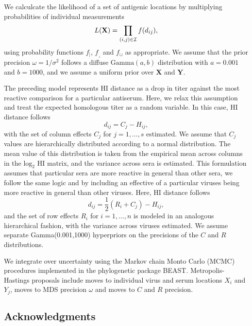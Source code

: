 \documentclass[11pt,oneside,letterpaper]{article}
\newcommand{\point}{f_{\scriptscriptstyle \vert}}
\newcommand{\threshold}{f_{\textstyle \lrcorner}}
\newcommand{\interval}{f_{\sqcup}}
\begin{document}
We calculcate the likelihood of a set of antigenic locations by multiplying probabilities of individual measurements
\begin{equation} 
	L(\mathbf{X}) = \prod_{(i,j) \in \cal I} f(d_{ij}),
\end{equation}
using probability functions $\point$, $\threshold$ and $\interval$ as appropriate.
We assume that the prior precision $\omega = 1/\sigma^2$ follows a diffuse $\mbox{Gamma}(a, b)$ distribution with $a=0.001$ and $b=1000$, and we assume a uniform prior over $\mathbf{X}$ and $\mathbf{Y}$.

The preceding model represents HI distance as a drop in titer against the most reactive comparison for a particular antiserum.  
Here, we relax this assumption and treat the expected homologous titer as a random variable.
In this case, HI distance follows
\begin{equation} 
	d_{ij} =  C_j - H_{ij},
\end{equation}
with the set of column effects $C_j$ for $j = 1,\ldots, s$ estimated.
We assume that $C_j$ values are hierarchically distributed according to a normal distribution.
The mean value of this distribution is taken from the empirical mean across columns in the $\mathrm{log}_2$ HI matrix, and the variance across sera is estimated.
This formulation assumes that particular sera are more reactive in general than other sera, we follow the same logic and by including an effective of a particular viruses being more reactive in general than other viruses.
Here, HI distance follows
\begin{equation} 
	d_{ij} =  \frac{1}{2} (R_i+C_j) - H_{ij},
\end{equation}
and the set of row effects $R_i$ for $i = 1,\ldots, n$ is modeled in an analogous hierarchical fashion, with the variance across viruses estimated.
We assume separate Gamma(0.001,1000) hyperpriors on the precisions of the $C$ and $R$ distributions.

We integrate over uncertainty using the Markov chain Monto Carlo (MCMC) procedures implemented in the phylogenetic package BEAST. Metropolis-Hastings proposals include moves to individual virus and serum locations $X_i$ and $Y_j$, moves to MDS precision $\omega$ and moves to $C$ and $R$ precision.

\subsection*{Acknowledgments} 
\end{document}
